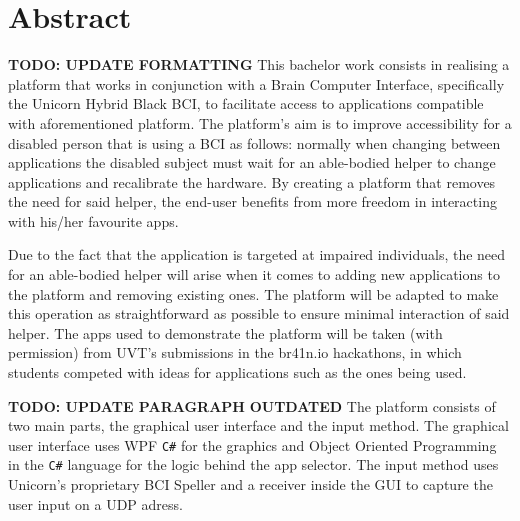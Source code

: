 \chapter*{Abstract}\label{cap:abstract_en}
\textbf{TODO: UPDATE FORMATTING} \newline
\hspace{\parindent} This bachelor work consists in realising a platform that works in conjunction with a Brain Computer Interface, specifically the Unicorn Hybrid Black BCI\cite{Unicorn_Technology}, to facilitate access to applications compatible with aforementioned platform. The platform's aim is to improve accessibility for a disabled person that is using a BCI as follows: normally when changing between applications the disabled subject must wait for an able-bodied helper to change applications and recalibrate the hardware. By creating a platform that removes the need for said helper, the end-user benefits from more freedom in interacting with his/her favourite apps. 

\vspace*{2mm}
\hspace{\parindent} Due to the fact that the application is targeted at impaired individuals, the need for an able-bodied helper will arise when it comes to adding new applications to the platform and removing existing ones. The platform will be adapted to make this operation as straightforward as possible to ensure minimal interaction of said helper. The apps used to demonstrate the platform will be taken (with permission) from UVT's submissions in the br41n.io hackathons, in which students competed with ideas for applications such as the ones being used.

\vspace*{2mm}\textbf{TODO: UPDATE PARAGRAPH}\newline
\hspace{\parindent} \textbf{OUTDATED} The platform consists of two main parts, the graphical user interface and the input method. The graphical user interface uses WPF \texttt{C\#} for the graphics and Object Oriented Programming in the \texttt{C\#} language for the logic behind the app selector. The input method uses Unicorn's proprietary BCI Speller\cite{Unicorn_Speller} and a receiver inside the GUI to capture the user input on a UDP adress.


